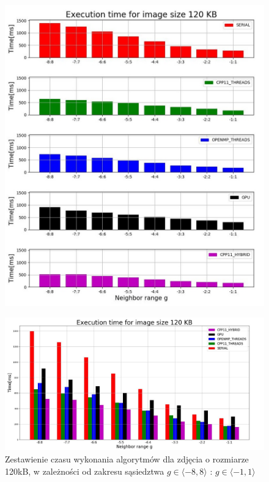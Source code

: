 \documentclass[document.tex]{subfiles}
\begin{document}
\clearpage
\begin{figure}[h]
\includegraphics[scale=0.6]{imgs/plot0_lap.jpg}
\caption*{}
\label{fig:results_lap_hybrid}
\end{figure}
\clearpage
\begin{figure}[h]
\includegraphics[scale=0.35]{imgs/plot1_lap.jpg}
\caption{Zestawienie czasu wykonania algorytmów dla zdjęcia o rozmiarze 120kB, 
        w zależności od zakresu sąsiedztwa $g\in \langle -8, 8 \rangle$ : $g\in \langle -1, 1 \rangle$ }
\label{fig:results_lap_hybrid}
\end{figure}
\end{document}
